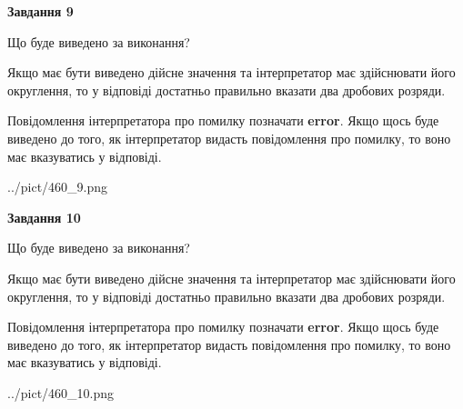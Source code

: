\documentclass[12pt, ukrainian]{article}
\begin{document}
{\begin {Large}
{\begin {center}\textbf{Завдання 9}\end {center}}\par
Що буде виведено за виконання? \par

Якщо має бути виведено дійсне значення та інтерпретатор має здійснювати його округлення, 
то у відповіді достатньо правильно вказати два дробових розряди.

Повідомлення інтерпретатора про помилку позначати \textbf{error}.
Якщо щось буде виведено до того, як інтерпретатор видасть повідомлення про помилку, 
то воно має вказуватись у відповіді. \par

\begin{center}
	{../pict/460_9.png}
\end{center}
\newpage

{\begin {center}\textbf{Завдання 10}\end {center}}\par
Що буде виведено за виконання? \par

Якщо має бути виведено дійсне значення та інтерпретатор має здійснювати його округлення, 
то у відповіді достатньо правильно вказати два дробових розряди.

Повідомлення інтерпретатора про помилку позначати \textbf{error}.
Якщо щось буде виведено до того, як інтерпретатор видасть повідомлення про помилку, 
то воно має вказуватись у відповіді. \par

\begin{center}
	{../pict/460_10.png}
\end{center}
\newpage

\end {Large}}
\end{document}
